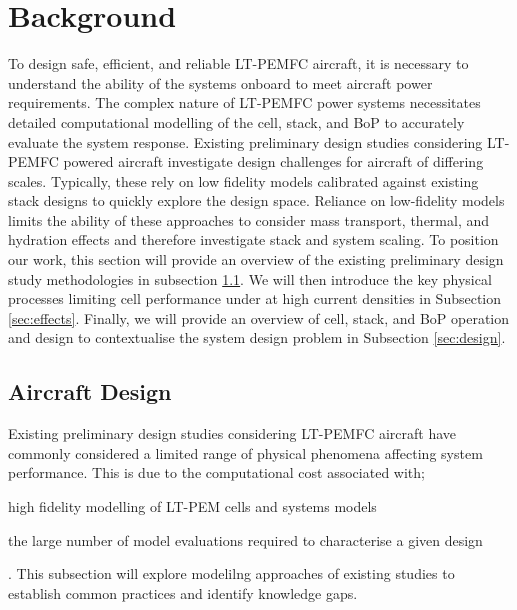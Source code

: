 \section{Background} \label{sec:background}
To design safe, efficient, and reliable LT-PEMFC aircraft, it is necessary to understand the ability of the systems onboard to meet aircraft power requirements.
The complex nature of LT-PEMFC power systems necessitates detailed computational modelling of the cell, stack, and BoP to accurately evaluate the system response.
Existing preliminary design studies considering LT-PEMFC powered aircraft investigate design challenges for aircraft of differing scales.
Typically, these rely on low fidelity models calibrated against existing stack designs to quickly explore the design space.
Reliance on low-fidelity models limits the ability of these approaches to consider mass transport, thermal, and hydration effects and therefore investigate stack and system scaling.
To position our work, this section will provide an overview of the existing preliminary design study methodologies in subsection \ref{sec:lit}.
We will then introduce the key physical processes limiting cell performance under at high current densities in Subsection \ref{sec:effects}.
Finally, we will provide an overview of cell, stack, and BoP operation and design to contextualise the system design problem in Subsection \ref{sec:design}.

\subsection{Aircraft Design} \label{sec:lit}
Existing preliminary design studies considering LT-PEMFC aircraft have commonly considered a limited range of physical phenomena affecting system performance.
This is due to the computational cost associated with; \begin{enumerate*} \item high fidelity modelling of LT-PEM cells and systems models \item the large number of model evaluations required to characterise a given design\end{enumerate*}.
This subsection will explore modelilng approaches of existing studies to establish common practices and identify knowledge gaps.

